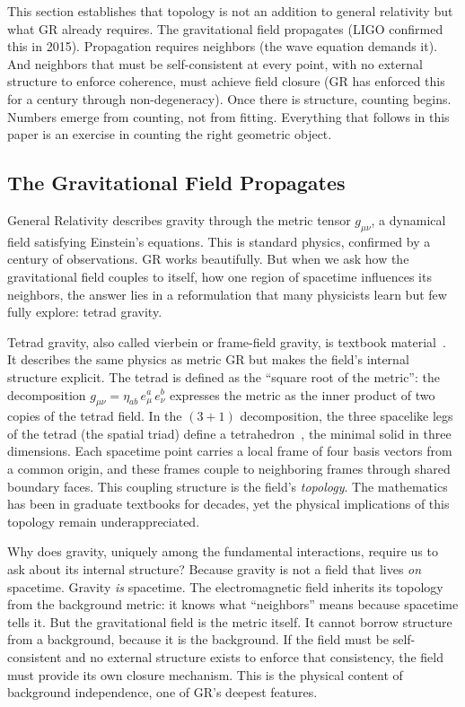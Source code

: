\documentclass[aps,prd,preprint,superscriptaddress,showpacs,preprintnumbers,amsmath,amssymb,nofootinbib]{revtex4-2}
\begin{document}
This section establishes that topology is not an addition to general relativity but what GR already requires. The gravitational field propagates (LIGO confirmed this in 2015). Propagation requires neighbors (the wave equation demands it). And neighbors that must be self-consistent at every point, with no external structure to enforce coherence, must achieve field closure (GR has enforced this for a century through non-degeneracy). Once there is structure, counting begins. Numbers emerge from counting, not from fitting. Everything that follows in this paper is an exercise in counting the right geometric object.

\subsection{The Gravitational Field Propagates}
\label{subsec:propagates}

General Relativity describes gravity through the metric tensor $g_{\mu\nu}$, a dynamical field satisfying Einstein's equations. This is standard physics, confirmed by a century of observations. GR works beautifully. But when we ask how the gravitational field couples to itself, how one region of spacetime influences its neighbors, the answer lies in a reformulation that many physicists learn but few fully explore: tetrad gravity.

Tetrad gravity, also called vierbein or frame-field gravity, is textbook material~\cite{mtw1973,wald1984}. It describes the same physics as metric GR but makes the field's internal structure explicit. The tetrad is defined as the ``square root of the metric'': the decomposition $g_{\mu\nu} = \eta_{ab}\,e^a_\mu\,e^b_\nu$ expresses the metric as the inner product of two copies of the tetrad field. In the $(3{+}1)$ decomposition, the three spacelike legs of the tetrad (the spatial triad) define a tetrahedron~\cite{barbieri1998}, the minimal solid in three dimensions. Each spacetime point carries a local frame of four basis vectors from a common origin, and these frames couple to neighboring frames through shared boundary faces. This coupling structure is the field's \emph{topology}. The mathematics has been in graduate textbooks for decades, yet the physical implications of this topology remain underappreciated.

Why does gravity, uniquely among the fundamental interactions, require us to ask about its internal structure? Because gravity is not a field that lives \emph{on} spacetime. Gravity \emph{is} spacetime. The electromagnetic field inherits its topology from the background metric: it knows what ``neighbors'' means because spacetime tells it. But the gravitational field is the metric itself. It cannot borrow structure from a background, because it is the background. If the field must be self-consistent and no external structure exists to enforce that consistency, the field must provide its own closure mechanism. This is the physical content of background independence, one of GR's deepest features.
\end{document}
